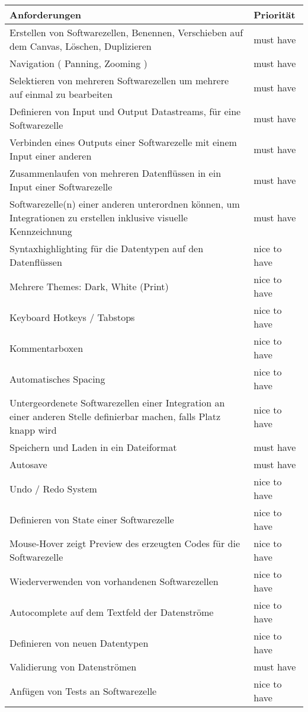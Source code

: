\begin{center}
\begin{tabular}{ll}
Anforderungen & Priorität\\
\hline
Erstellen von Softwarezellen, Benennen, Verschieben auf dem Canvas, Löschen, Duplizieren & must have\\
Navigation ( Panning, Zooming ) & must have\\
Selektieren von mehreren Softwarezellen um mehrere auf einmal zu bearbeiten & must have\\
Definieren von Input und Output Datastreams, für eine Softwarezelle & must have\\
Verbinden eines Outputs einer Softwarezelle mit einem Input einer anderen & must have\\
Zusammenlaufen von mehreren Datenflüssen in ein Input einer Softwarezelle & must have\\
Softwarezelle(n) einer anderen unterordnen können, um Integrationen zu erstellen inklusive visuelle Kennzeichnung & must have\\
Syntaxhighlighting für die Datentypen auf den Datenflüssen & nice to have\\
Mehrere Themes: Dark, White (Print) & nice to have\\
Keyboard Hotkeys / Tabstops & nice to have\\
Kommentarboxen & nice to have\\
Automatisches Spacing & nice to have\\
Untergeordenete Softwarezellen einer Integration an einer anderen Stelle definierbar machen, falls Platz knapp wird & nice to have\\
Speichern und Laden in ein Dateiformat & must have\\
Autosave & must have\\
Undo / Redo System & nice to have\\
Definieren von State einer Softwarezelle & nice to have\\
Mouse-Hover zeigt Preview des erzeugten Codes für die Softwarezelle & nice to have\\
Wiederverwenden von vorhandenen Softwarezellen & nice to have\\
Autocomplete auf dem Textfeld der Datenströme & nice to have\\
Definieren von neuen Datentypen & nice to have\\
Validierung von Datenströmen & must have\\
Anfügen von Tests an Softwarezelle & nice to have\\
\end{tabular}
\end{center}

